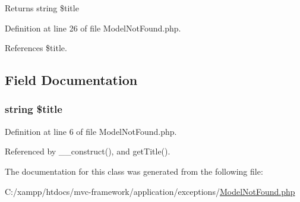 \begin{DoxyReturn}{Returns}
string \$title 
\end{DoxyReturn}


Definition at line 26 of file Model\+Not\+Found.\+php.



References \$title.




\subsection{Field Documentation}
\hypertarget{class_model_not_found_a5ef02115477cfad473df2455da5a908e}{}
\subsubsection[{\$title}]{\setlength{\rightskip}{0pt plus 5cm}string \$title\hspace{0.3cm}{\ttfamily [protected]}}\label{class_model_not_found_a5ef02115477cfad473df2455da5a908e}


Definition at line 6 of file Model\+Not\+Found.\+php.



Referenced by \+\_\+\+\_\+construct(), and get\+Title().



The documentation for this class was generated from the following file\+:\begin{DoxyCompactItemize}
\item 
C\+:/xampp/htdocs/mvc-\/framework/application/exceptions/\hyperlink{_model_not_found_8php}{Model\+Not\+Found.\+php}\end{DoxyCompactItemize}
